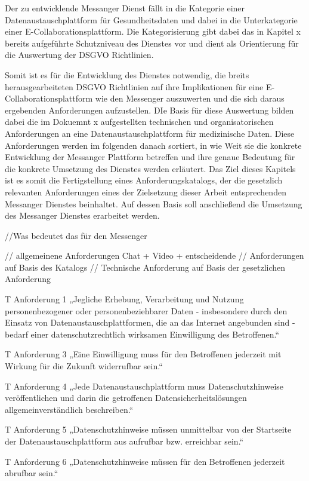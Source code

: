 Der zu entwicklende Messanger Dienst fällt in die Kategorie einer Datenaustauschplattform für Gesundheitsdaten und dabei in die Unterkategorie einer E-Collaborationsplattform. Die Kategorisierung gibt dabei das in Kapitel x bereits aufgeführte Schutzniveau des Dienstes vor und dient als Orientierung für die Auswertung der DSGVO Richtlinien. 

Somit ist es für die Entwicklung des Dienstes notwendig, die breits herausgearbeiteten DSGVO Richtlinien auf ihre Implikationen für eine E-Collaborationsplattform wie den Messenger auszuwerten und die sich daraus ergebenden Anforderungen aufzustellen. 
DIe Basis für diese Auswertung bilden dabei die im Dokuemnt x aufgestellten technischen und organisatorischen Anforderungen an eine Datenaustauschplattform für medizinische Daten. Diese Anforderungen werden im folgenden danach sortiert, in wie Weit sie die konkrete Entwicklung der Messanger Plattform betreffen und ihre genaue Bedeutung für die konkrete Umsetzung des Dienstes werden erläutert.
Das Ziel dieses Kapitels ist es somit die Fertigstellung eines Anforderungskatalogs, der die gesetzlich relevanten Anforderungen eines der Zielsetzung dieser Arbeit entsprechenden Messanger Dienstes beinhaltet. Auf dessen Basis soll anschließend die Umsetzung des Messanger Dienstes erarbeitet werden.

//Was bedeutet das für den Messenger


// allgemeinene Anforderungen Chat + Video + entscheidende
// Anforderungen auf Basis des Katalogs 
// Technische Anforderung auf Basis der gesetzlichen Anforderung 

T Anforderung 1
„Jegliche Erhebung, Verarbeitung und Nutzung personenbezogener oder personenbeziehbarer Daten - insbesondere durch den Einsatz von Datenaustauschplattformen, die an das Internet angebunden sind - bedarf einer datenschutzrechtlich wirksamen Einwilligung des Betroffenen.“

T Anforderung 3
„Eine Einwilligung muss für den Betroffenen jederzeit mit Wirkung für die Zukunft widerrufbar sein.“

T Anforderung 4
„Jede Datenaustauschplattform muss Datenschutzhinweise veröffentlichen und darin die getroffenen Datensicherheitslösungen allgemeinverständlich beschreiben.“

T Anforderung 5
„Datenschutzhinweise müssen unmittelbar von der Startseite der Datenaustauschplattform aus aufrufbar bzw. erreichbar sein.“

T Anforderung 6
„Datenschutzhinweise müssen für den Betroffenen jederzeit abrufbar sein.“

